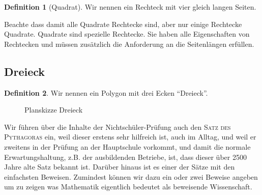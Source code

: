 \documentclass[a4paper]{book}%
\theoremstyle{definition}
\newtheorem{definition}{Definition}
\begin{document}
\begin{definition}[Quadrat]
    Wir nennen ein Rechteck mit vier gleich langen Seiten.
\end{definition}

Beachte dass damit alle Quadrate Rechtecke sind, aber nur einige Rechtecke Quadrate. Quadrate sind spezielle Rechtecke. Sie haben alle Eigenschaften von Rechtecken und müssen zusätzlich die Anforderung an die Seitenlängen erfüllen.


\subsection{Dreieck}\label{Dreieck}

\begin{definition}
    Wir nennen ein Polygon mit drei Ecken \enquote{Dreieck}.
\end{definition}

\begin{figure}
  \centering
  \caption{Planskizze Dreieck}\label{fig:DreieckPlanskizze}
\end{figure}

Wir führen über die Inhalte der Nichtschüler-Prüfung auch den \textsc{Satz des Pythagoras} ein, weil dieser erstens sehr hilfreich ist, auch im Alltag, und weil er zweitens in der Prüfung an der Hauptschule vorkommt, und damit die normale Erwartungshaltung, z.B. der ausbildenden Betriebe, ist, dass dieser über 2500 Jahre alte Satz bekannt ist. Darüber hinaus ist es einer der Sätze mit den einfachsten Beweisen. Zumindest können wir dazu ein oder zwei Beweise angeben um zu zeigen was Mathematik eigentlich bedeutet als beweisende Wissenschaft.
\end{document}
